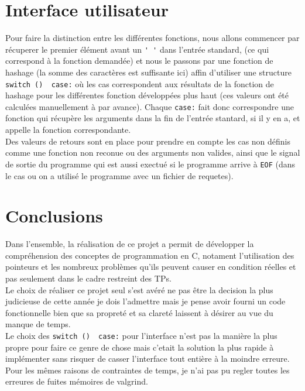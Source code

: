 \documentclass[a4paper, 9pt]{article}
\begin{document}
	\section{Interface utilisateur}
	Pour faire la distinction entre les différentes fonctions, nous allons commencer par récuperer le premier élément avant un \lstinline|' '| dans l'entrée standard, (ce qui correspond à la fonction demandée) et nous le passons par une fonction de hashage (la somme des caractères est suffisante ici) affin d'utiliser une structure \lstinline|switch ()  case:| où les cas correspondent aux résultats de la fonction de hashage pour les différentes fonction développées plus haut (ces valeurs ont été calculées manuellement à par avance). Chaque \lstinline|case:| fait donc correspondre une fonction qui récupère les arguments dans la fin de l'entrée stantard, si il y en a, et appelle la fonction correspondante.\\
	Des valeurs de retours sont en place pour prendre en compte les cas non définis comme une fonction non reconue ou des arguments non valides, ainsi que le signal de sortie du programme qui est aussi exectué si le programme arrive à \lstinline|EOF| (dans le cas ou on a utilisé le programme avec un fichier de requetes).\\

	\section{Conclusions}
	Dans l'ensemble, la réalisation de ce projet a permit de développer la compréhension des conceptes de programmation en C, notament l'utilisation des pointeurs et les nombreux problèmes qu'ils peuvent causer en condition réelles et pas seulement dans le cadre restreint des TPs.\\
	Le choix de réaliser ce projet seul s'est avéré ne pas être la decision la plus judicieuse de cette année je dois l'admettre mais je pense avoir fourni un code fonctionnelle bien que sa propreté et sa clareté laissent à désirer au vue du manque de temps.\\
	Le choix des \lstinline|switch ()  case:| pour l'interface n'est pas la manière la plus propre pour faire ce genre de chose mais c'etait la solution la plus rapide à implémenter sans risquer de casser l'interface tout entière à la moindre erreure.\\  
	Pour les mêmes raisons de contraintes de temps, je n'ai pas pu regler toutes les erreures de fuites mémoires de valgrind.\\
	
	
	
	
\end{document}
